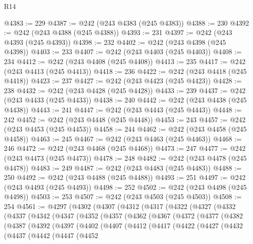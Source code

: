 \begin{lexlean}{R14}
\begin{coremodule}
{{{{{{{{{{{{{{{{{{{{{{{{{{{{{{{{{{{{{{{{{{{{{{{{{{{{{{{{{{{{{{{{{{{{{{{{{{{{{{{{{{@4383 := 229
@4387 := @242 (@243 @4383 (@245 @4383))
@4388 := 230
@4392 := @242 (@243 @4388 (@245 @4388))
@4393 := 231
@4397 := @242 (@243 @4393 (@245 @4393))
@4398 := 232
@4402 := @242 (@243 @4398 (@245 @4398))
@4403 := 233
@4407 := @242 (@243 @4403 (@245 @4403))
@4408 := 234
@4412 := @242 (@243 @4408 (@245 @4408))
@4413 := 235
@4417 := @242 (@243 @4413 (@245 @4413))
@4418 := 236
@4422 := @242 (@243 @4418 (@245 @4418))
@4423 := 237
@4427 := @242 (@243 @4423 (@245 @4423))
@4428 := 238
@4432 := @242 (@243 @4428 (@245 @4428))
@4433 := 239
@4437 := @242 (@243 @4433 (@245 @4433))
@4438 := 240
@4442 := @242 (@243 @4438 (@245 @4438))
@4443 := 241
@4447 := @242 (@243 @4443 (@245 @4443))
@4448 := 242
@4452 := @242 (@243 @4448 (@245 @4448))
@4453 := 243
@4457 := @242 (@243 @4453 (@245 @4453))
@4458 := 244
@4462 := @242 (@243 @4458 (@245 @4458))
@4463 := 245
@4467 := @242 (@243 @4463 (@245 @4463))
@4468 := 246
@4472 := @242 (@243 @4468 (@245 @4468))
@4473 := 247
@4477 := @242 (@243 @4473 (@245 @4473))
@4478 := 248
@4482 := @242 (@243 @4478 (@245 @4478))
@4483 := 249
@4487 := @242 (@243 @4483 (@245 @4483))
@4488 := 250
@4492 := @242 (@243 @4488 (@245 @4488))
@4493 := 251
@4497 := @242 (@243 @4493 (@245 @4493))
@4498 := 252
@4502 := @242 (@243 @4498 (@245 @4498))
@4503 := 253
@4507 := @242 (@243 @4503 (@245 @4503))
@4508 := 254
@4561 := @4297
    (@4302
      (@4307
        (@4312
          (@4317
            (@4322
              (@4327
                (@4332
                  (@4337
                    (@4342
                      (@4347
                        (@4352
                          (@4357
                            (@4362
                              (@4367
                                (@4372
                                  (@4377
                                    (@4382
                                      (@4387
                                        (@4392
                                          (@4397
                                            (@4402
                                              (@4407
                                                (@4412
                                                  (@4417
                                                    (@4422
                                                      (@4427
                                                        (@4432
                                                          (@4437
                                                            (@4442
                                                              (@4447
                                                                (@4452
}}}}}}}}}}}}}}}}}}}}}}}}}}}}}}}}}}}}}}}}}}}}}}}}}}}}}}}}}}}}}}}}}}}}}}}}}}}}}}}}}}
\end{coremodule}
\end{lexlean}
